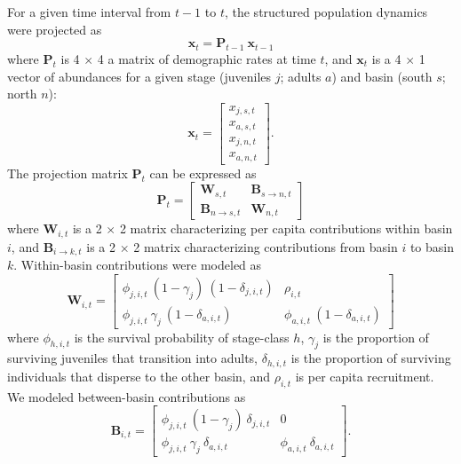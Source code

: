 \documentclass[11pt]{article}
\begin{document}
For a given time interval from $t-1$ to $t$, 
the structured population dynamics were projected as
%
\begin{equation} \label{eq:XPX}
    \mathbf{x}_t = \mathbf{P}_{t-1}~\mathbf{x}_{t-1}
\end{equation}
%
where $\mathbf{P}_{t}$ is 4 $\times$ 4 a matrix of demographic rates at time $t$, 
and $\mathbf{x}_{t}$ is a 4 $\times$ 1 vector of abundances 
for a given stage (juveniles $j$; adults $a$) 
and basin (south $s$; north $n$):
%
\begin{equation} \label{eq:X}
\mathbf{x}_{t} = 
\left[
\begin{array}{cccc}
    {x_{j,s,t}} \\
    {x_{a,s,t}} \\
    {x_{j,n,t}} \\
    {x_{a,n,t}}
    \end{array}
\right]
\text{.}
\end{equation}
%
The projection matrix $\mathbf{P}_{t}$ can be expressed as
%
\begin{equation} \label{eq:P}
\mathbf{P}_{t} = 
\left[
\begin{array}{c|ccc}
    \mathbf{W}_{s,t}  & \mathbf{B}_{s\rightarrow n,t} \\
    \hline
    \mathbf{B}_{n\rightarrow s,t} & \mathbf{W}_{n,t}
    \end{array}
\right]
\end{equation}
%
where $\mathbf{W}_{i,t}$ is a 2 $\times$ 2 matrix characterizing 
per capita contributions within basin $i$,
and $\mathbf{B}_{i\rightarrow k,t}$ is a 2 $\times$ 2 matrix characterizing 
contributions from basin $i$ to basin $k$.
Within-basin contributions were modeled as 
\begin{equation} \label{eq:W}
\mathbf{W}_{i,t} = 
\left[
\begin{array}{cccc}
    \phi_{j,i,t}~(1-\gamma_{j})~(1-\delta_{j,i,t}) & 
    \rho_{i,t} \\
    \phi_{j,i,t}~\gamma_{j}~(1-\delta_{a,i,t}) & 
    \phi_{a,i,t}~(1-\delta_{a,i,t})
    \end{array}
\right]
\end{equation}
%
where $\phi_{h,i,t}$ is the survival probability of stage-class $h$, 
$\gamma_{j}$ is the proportion of surviving juveniles that transition into adults,
$\delta_{h,i,t}$ is the proportion of surviving individuals that disperse to the other basin,
and $\rho_{i,t}$ is per capita recruitment.
We modeled between-basin contributions as
%
\begin{equation} \label{eq:B}
\mathbf{B}_{i,t} = 
\left[
\begin{array}{cccc}
    \phi_{j,i,t}~(1 - \gamma_{j})~\delta_{j,i,t} & 
    0 \\
    
    \phi_{j,i,t}~\gamma_{j}~\delta_{a,i,t} & 
    \phi_{a,i,t}~\delta_{a,i,t}
    \end{array}
\right].
\end{equation}
\end{document}

